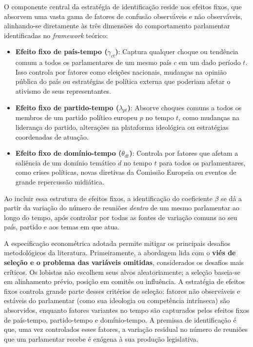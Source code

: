 O componente central da estratégia de identificação reside nos efeitos fixos, que absorvem uma vasta gama de fatores de confusão observáveis e não observáveis, alinhando-se diretamente às três dimensões do comportamento parlamentar identificadas no \textit{framework} teórico:
\begin{itemize}
    \item \textbf{Efeito fixo de país-tempo ($\gamma_{ct}$)}: Captura qualquer choque ou tendência comum a todos os parlamentares de um mesmo país $c$ em um dado período $t$. Isso controla por fatores como eleições nacionais, mudanças na opinião pública do país ou estratégias de política externa que poderiam afetar o ativismo de seus representantes.
    \item \textbf{Efeito fixo de partido-tempo ($\lambda_{pt}$)}: Absorve choques comuns a todos os membros de um partido político europeu $p$ no tempo $t$, como mudanças na liderança do partido, alterações na plataforma ideológica ou estratégias coordenadas de atuação.
    \item \textbf{Efeito fixo de domínio-tempo ($\theta_{dt}$)}: Controla por fatores que afetam a saliência de um domínio temático $d$ no tempo $t$ para todos os parlamentares, como crises políticas, novas diretivas da Comissão Europeia ou eventos de grande repercussão midiática.
\end{itemize}

Ao incluir essa estrutura de efeitos fixos, a identificação do coeficiente $\beta$ se dá a partir da variação do número de reuniões \textit{dentro} de um mesmo parlamentar ao longo do tempo, após controlar por todas as fontes de variação comuns ao seu país, partido e aos temas em que atua.

A especificação econométrica adotada permite mitigar os principais desafios metodológicos da literatura. Primeiramente, a abordagem lida com o \textbf{viés de seleção e o problema das variáveis omitidas}, considerados os desafios mais críticos. Os lobistas não escolhem seus alvos aleatoriamente; a seleção baseia-se em alinhamento prévio, posição em comitês ou influência. A estratégia de efeitos fixos controla grande parte desses critérios de seleção: fatores não observáveis e estáveis do parlamentar (como sua ideologia ou competência intrínseca) são absorvidos, enquanto fatores variantes no tempo são capturados pelos efeitos fixos de país-tempo, partido-tempo e domínio-tempo. A premissa de identificação é que, uma vez controlados esses fatores, a variação residual no número de reuniões que um parlamentar recebe é exógena à sua produção legislativa.

